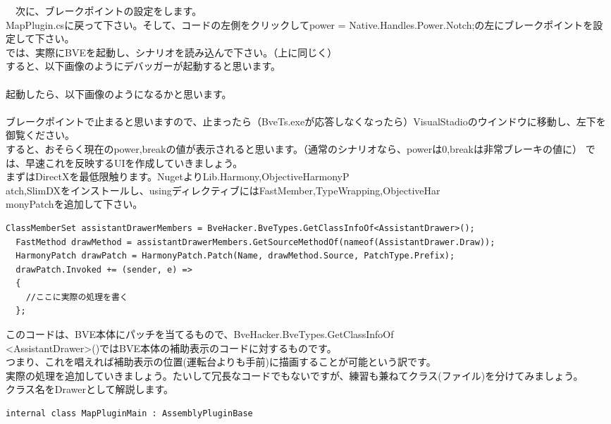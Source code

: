 \documentclass[b5paper,9pt,platex,dvipdfmx]{jsarticle}
\begin{document}
\begin{multicols*}{3}
　次に、ブレークポイントの設定をします。\\
MapPlugin.csに戻って下さい。そして、コードの左側をクリックしてpower = Native.Handles.Power.Notch;の左にブレークポイントを設定して下さい。\\
では、実際にBVEを起動し、シナリオを読み込んで下さい。（上に同じく）\\
すると、以下画像のようにデバッガーが起動すると思います。\\
\\
起動したら、以下画像のようになるかと思います。\\
\\
ブレークポイントで止まると思いますので、止まったら（BveTs.exeが応答しなくなったら）VisualStadioのウインドウに移動し、左下を御覧ください。\\
すると、おそらく現在のpower,breakの値が表示されると思います。（通常のシナリオなら、powerは0,breakは非常ブレーキの値に）
では、早速これを反映するUIを作成していきましょう。\\
まずはDirectXを最低限触ります。NugetよりLib.Harmony,ObjectiveHarmonyP\\atch,SlimDXをインストールし、usingディレクティブにはFastMember,TypeWrapping,ObjectiveHar\\monyPatchを追加して下さい。\\
\begin{lstlisting}[caption= MapPluginMain()]
  ClassMemberSet assistantDrawerMembers = BveHacker.BveTypes.GetClassInfoOf<AssistantDrawer>();
  FastMethod drawMethod = assistantDrawerMembers.GetSourceMethodOf(nameof(AssistantDrawer.Draw));
  HarmonyPatch drawPatch = HarmonyPatch.Patch(Name, drawMethod.Source, PatchType.Prefix);
  drawPatch.Invoked += (sender, e) =>
  {
    //ここに実際の処理を書く
  };
\end{lstlisting}
このコードは、BVE本体にパッチを当てるもので、BveHacker.BveTypes.GetClassInfoOf\\\textless AssistantDrawer\textgreater ()ではBVE本体の補助表示のコードに対するものです。\\
つまり、これを唱えれば補助表示の位置(運転台よりも手前)に描画することが可能という訳です。\\
実際の処理を追加していきましょう。たいして冗長なコードでもないですが、練習も兼ねてクラス(ファイル)を分けてみましょう。\\
クラス名をDrawerとして解説します。\\
\begin{lstlisting}[caption = クラス直下～PluginMain]
  internal class MapPluginMain : AssemblyPluginBase

\end{lstlisting}
\end{multicols*}
\end{document}
